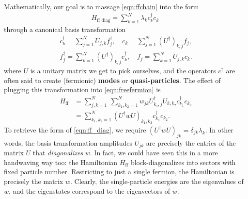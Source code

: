 Mathematically, our goal is to massage \cref{eqn:ffchain} into the form 
\begin{align}
H_\text{ff diag} = \sum_{k=1}^N \lambda_k c^\dagger_k c_k\
\label{eqn:ff_diag}
\end{align}
through a canonical basis transformation
\begin{align}
c^\dagger_k= \sum_{j=1}^N U_{j,k} f^\dagger_j, \quad c_k = \sum_{j=1}^N (U^\dagger)_{k,j} f_j, \\
f^\dagger_j= \sum_{k=1}^N (U^\dagger)_{k,j} c^\dagger_k, \quad f_j = \sum_{k=1}^N U_{j,k} c_k.
\end{align} 
where $U$ is a unitary matrix we get to pick ourselves, and the operators $c^\dagger$ are often said to create (fermionic) \textbf{modes} or \textbf{quasi-particles}. The effect of plugging this transformation into \cref{eqn:freefermion} is
\begin{align*}
H_\text{ff} &= \sum_{j,k = 1}^N \ \sum_{k_1, k_2 = 1}^N w_{jk} U^\dagger_{k_1,j} U_{k,k_2} c^\dagger_{k_1} c_{k_2} \\
 &= \sum_{k_1, k_2 = 1}^N \left( U^\dagger w U \right)_{k_1, k_2} c^\dagger_{k_1} c_{k_2}.
\end{align*} 
To retrieve the form of \cref{eqn:ff_diag}, we require $( U^\dagger w U )_{jk} = \delta_{jk} \lambda_k$. In other words, the basis transformation amplitudes $U_{jk}$ are precisely the entries of the matrix $U$ that \emph{diagonalizes} $w$. In fact, we could have seen this in a more handwaving way too: the Hamiltonian $H_\text{ff}$ block-diagonalizes into sectors with fixed particle number. Restricting to just a single fermion, the Hamiltonian is precisely the matrix $w$. Clearly, the single-particle energies are the eigenvalues of $w$, and the eigenstates correspond to the eigenvectors of $w$.

